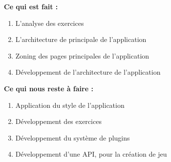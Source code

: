 \textbf{Ce qui est fait :}
\begin{enumerate}
\item L'analyse des exercices
\item L'architecture de principale de l'application
\item Zoning des pages principales de l'application
\item Développement de l'architecture de l'application
\end{enumerate}

\textbf{Ce qui nous reste à faire :}
\begin{enumerate}
\item Application du style de l'application
\item Développement des exercices
\item Développement du système de plugins
\item Développement d'une API, pour la création de jeu
\end{enumerate}